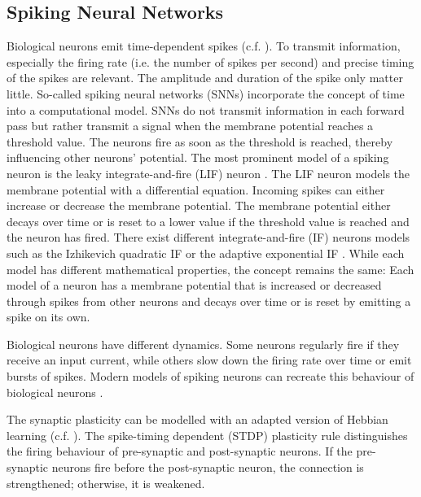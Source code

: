 \subsection{Spiking Neural Networks}
Biological neurons emit time-dependent spikes (c.f. ).
To transmit information, especially the firing rate (i.e. the number of spikes per second) and precise timing of the spikes are relevant.
The amplitude and duration of the spike only matter little.
So-called spiking neural networks (SNNs) incorporate the concept of time into a computational model.
SNNs do not transmit information in each forward pass but rather transmit a signal when the membrane potential reaches a threshold value. 
The neurons fire as soon as the threshold is reached, thereby influencing other neurons' potential.
The most prominent model of a spiking neuron is the leaky integrate-and-fire (LIF) neuron .
The LIF neuron models the membrane potential with a differential equation.
Incoming spikes can either increase or decrease the membrane potential.
The membrane potential either decays over time or is reset to a lower value if the threshold value is reached and the neuron has fired.
There exist different integrate-and-fire (IF) neurons models such as the Izhikevich quadratic IF  or the adaptive exponential IF .
While each model has different mathematical properties, the concept remains the same: Each model of a neuron has a membrane potential that is increased or decreased through spikes from other neurons and decays over time or is reset by emitting a spike on its own.

Biological neurons have different dynamics.
Some neurons regularly fire if they receive an input current, while others slow down the firing rate over time or emit bursts of spikes.
Modern models of spiking neurons can recreate this behaviour of biological neurons .

The synaptic plasticity can be modelled with an adapted version of Hebbian learning (c.f. ).
The spike-timing dependent (STDP) plasticity rule  distinguishes the firing behaviour of pre-synaptic and post-synaptic neurons.
If the pre-synaptic neurons fire before the post-synaptic neuron, the connection is strengthened; otherwise, it is weakened.

